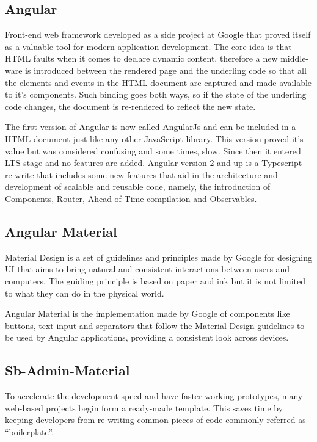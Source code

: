 \subsection{Angular}
Front-end web framework developed as a side project at Google that proved itself as a valuable tool for modern application development. The core idea is that \gls{HTML} faults when it comes to declare dynamic content\cite{angularjs}, therefore a new middle-ware is introduced between the rendered page and the underling code so that all the elements and events in the \gls{HTML} document are captured and made available to it's components. Such binding goes both ways, so if the state of the underling code changes, the document is re-rendered to reflect the new state.

The first version of Angular is now called AngularJs and can be included in a \gls{HTML} document just like any other JavaScript library. This version proved it's value but was considered confusing and some times, slow. Since then it entered \gls{LTS} stage and no features are added. Angular version 2 and up is a Typescript re-write that includes some new features that aid in the architecture and development of scalable and reusable code, namely, the introduction of Components, Router, Ahead-of-Time compilation and Observables\cite{angular}.


\subsection{Angular Material}
Material Design is a set of guidelines and principles made by Google for designing \gls{UI} that aims to bring natural and consistent interactions between users and computers. The guiding principle is based on paper and ink but it is not limited to what they can do in the physical world\cite{materialdesign}.

Angular Material\cite{angularmaterial} is the implementation made by Google of components like buttons, text input and separators that follow the Material Design guidelines to be used by Angular applications, providing a consistent look across devices.

\subsection{Sb-Admin-Material}
To accelerate the development speed and have faster working prototypes, many web-based projects begin form a ready-made template. This saves time by keeping developers from re-writing common pieces of code commonly referred as ``boilerplate''.

